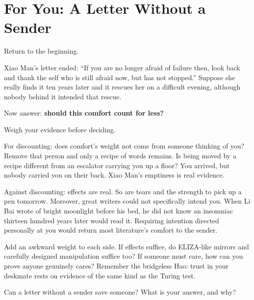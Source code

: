 \section{For You: A Letter Without a Sender}
Return to the beginning.

Xiao Man's letter ended: ``If you are no longer afraid of failure then, look back and thank the self who is still afraid now, but has not stopped.'' Suppose she really finds it ten years later and it rescues her on a difficult evening, although nobody behind it intended that rescue.

Now answer: \textbf{should this comfort count for less?}

Weigh your evidence before deciding.

For discounting: does comfort's weight not come from someone thinking of you? Remove that person and only a recipe of words remains. Is being moved by a recipe different from an escalator carrying you up a floor? You arrived, but nobody carried you on their back. Xiao Man's emptiness is real evidence.

Against discounting: effects are real. So are tears and the strength to pick up a pen tomorrow. Moreover, great writers could not specifically intend you. When Li Bai wrote of bright moonlight before his bed, he did not know an insomniac thirteen hundred years later would read it. Requiring intention directed personally at you would return most literature's comfort to the sender.

Add an awkward weight to each side. If effects suffice, do ELIZA-like mirrors and carefully designed manipulation suffice too? If someone must care, how can you prove anyone genuinely cares? Remember the bridgeless Hao: trust in your deskmate rests on evidence of the same kind as the Turing test.

Can a letter without a sender save someone? What is your answer, and why?
